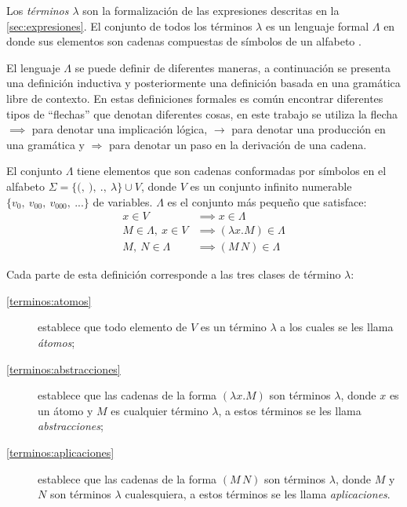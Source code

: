 Los \emph{términos $ λ $} son la formalización de las expresiones descritas en la \autoref{sec:expresiones}. El conjunto de todos los términos $ λ $ es un lenguaje formal $ Λ $ en donde sus elementos son cadenas compuestas de símbolos de un alfabeto \cite{Hopcroft:Automata}.

El lenguaje $ Λ $ se puede definir de diferentes maneras, a continuación se presenta una definición inductiva y posteriormente una definición basada en una gramática libre de contexto. En estas definiciones formales es común encontrar diferentes tipos de ``flechas'' que denotan diferentes cosas, en este trabajo se utiliza la flecha $ \implies $ para denotar una implicación lógica, $ \longrightarrow $ para denotar una producción en una gramática y $ \Rightarrow $ para denotar un paso en la derivación de una cadena.

\begin{defn}[Términos $ λ $]
  El conjunto $ Λ $ tiene elementos que son cadenas conformadas por símbolos en el alfabeto $ Σ=\{\mathtt{(},\ \mathtt{)},\ \mathtt{.},\ λ\} \cup V $, donde $ V $ es un conjunto infinito numerable $ \{v_{0},\ v_{00},\ v_{000},\ ... \} $ de variables. $ Λ $ es el conjunto más pequeño que satisface:
  \label{defn:terminos}
  \begin{subequations}
    \begin{align}
      \label{terminos:atomos}
      x \in V & \implies x \in Λ \\
      \label{terminos:abstracciones}
      M \in Λ,\ x \in V & \implies (λx.M) \in Λ \\
      \label{terminos:aplicaciones}
      M,\ N \in Λ & \implies (M\, N) \in Λ
    \end{align}
  \end{subequations}
\end{defn}

Cada parte de esta definición corresponde a las tres clases de término $ λ $:

\begin{description}
\item[\eqref{terminos:atomos}] establece que todo elemento de $ V $ es un término $ λ $ a los cuales se les llama \emph{átomos};
\item[\eqref{terminos:abstracciones}] establece que las cadenas de la forma $ (λx.M) $ son términos $ λ $, donde $ x $ es un átomo y $ M $ es cualquier término $ λ $, a estos términos se les llama \emph{abstracciones};
\item[\eqref{terminos:aplicaciones}] establece que las cadenas de la forma $ (M\, N) $ son términos $ λ $, donde $ M $ y $ N $ son términos $ λ $ cualesquiera, a estos términos se les llama \emph{aplicaciones}.
\end{description}

